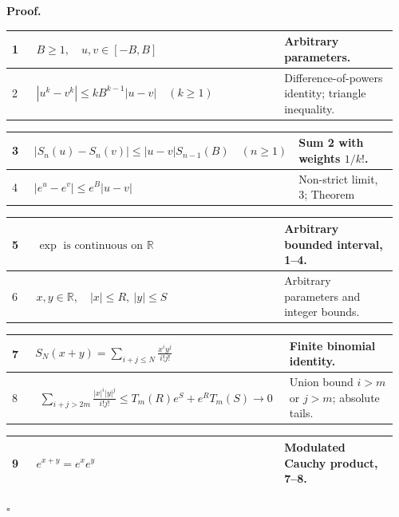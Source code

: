 \documentclass[11pt,reqno]{amsart}
\renewcommand{\arraystretch}{1.0}
\theoremstyle{redplain}
\renewcommand{\qedsymbol}{\textcolor{proofqed}{\ensuremath{\square}}}
\renewenvironment{proof}[1][Proof]{\par\noindent\textbf{\textcolor{proofhead}{#1.}}\par\nobreak}{\par\nobreak\hfill\qedsymbol}
\numberwithin{equation}{section}
\begin{document}
\begin{proof}
\smallskip \noindent {\ \setlength{\tabcolsep}{3pt}\renewcommand{%
\arraystretch}{1.18}}


\begin{tabular}{|@{}p{0.06\linewidth}p{0.61\linewidth}p{0.29\linewidth}}
\hline
1 & $B\ge1,\quad u,v\in[-B,B]$ & Arbitrary parameters. \\ \hline
2 & $|u^k-v^k|\le kB^{k-1}|u-v|\quad(k\ge1)$ & Difference-of-powers
identity; triangle inequality. \\ 
\end{tabular}%
\noindent \text{ \ }\newline
\noindent 
\begin{tabular}{|@{}p{0.06\linewidth}p{0.61\linewidth}p{0.29\linewidth}}
\hline
3 & $|S_n(u)-S_n(v)|\le |u-v|S_{n-1}(B)\quad(n\ge1)$ & Sum 2 with weights $%
1/k!$. \\ \hline
4 & $|e^u-e^v|\le e^B|u-v|$ & Non-strict limit, 3; Theorem~\ref%
{thm:uniform-tail}. \\ 
\end{tabular}%
\noindent \text{ \ }\newline
\noindent 
\begin{tabular}{|@{}p{0.06\linewidth}p{0.61\linewidth}p{0.29\linewidth}}
\hline
5 & $\exp\text{ is continuous on }\mathbb{R}$ & Arbitrary bounded interval,
1--4. \\ \hline
6 & $x,y\in\mathbb{R},\quad |x|\le R,\ |y|\le S$ & Arbitrary parameters and
integer bounds. \\ 
\end{tabular}%
\noindent \text{ \ }\newline
\noindent 
\begin{tabular}{|@{}p{0.06\linewidth}p{0.61\linewidth}p{0.29\linewidth}}
\hline
7 & $S_N(x+y)=\displaystyle\sum_{i+j\le N}\frac{x^iy^j}{i!j!}$ & Finite
binomial identity. \\ \hline
8 & \medskip \medskip $\begin{aligned}\sum_{i+j>2m}\frac{|x|^i|y|^j}{i!j!}
\le T_m(R)e^S+e^R T_m(S)\to0\end{aligned}$ & Union bound $i>m$ or $j>m$;
absolute tails. \\  
\end{tabular}%
\noindent \text{ \ }\newline
\noindent 
\begin{tabular}{|@{}p{0.06\linewidth}p{0.61\linewidth}p{0.29\linewidth}}
\hline
9 & $e^{x+y}=e^xe^y$ & Modulated Cauchy product, 7--8. \\ \hline

\end{tabular}
\end{proof}
\end{document}
